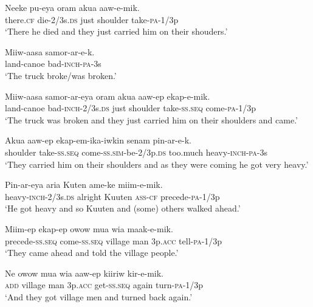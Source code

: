 \ea
\gll  Neeke  pu-eya  oram  akua  aaw-e-mik. \\
there.\textsc{cf}  die-2/3s.\textsc{ds}  just  shoulder  take-\textsc{pa}-1/3p \\
\glt ‘There he died and they just carried him on their shouders.’ \\
\z


\ea
\gll  Miiw-aasa  samor-ar-e-k. \\
land-canoe  bad-\textsc{inch}-\textsc{pa}-3s \\
\glt ‘The truck broke/was broken.’ \\
\z


\ea
\gll  Miiw-aasa  samor-ar-eya  oram  akua  aaw-ep  ekap-e-mik. \\
land-canoe  bad-\textsc{inch}-2/3s.\textsc{ds}  just  shoulder  take-\textsc{ss.seq}  come-\textsc{pa}-1/3p \\
\glt ‘The truck was broken and they just carried him on their shoulders and came.’ \\
\z


\ea
\gll  Akua  aaw-ep  ekap-em-ika-iwkin  senam             pin-ar-e-k. \\
shoulder  take-\textsc{ss.seq}  come-\textsc{ss}.\textsc{sim}-be-2/3p.\textsc{ds}  too.much  heavy-\textsc{inch}-\textsc{pa}-3s \\


\glt ‘They carried him on their shoulders and as they were coming he got very heavy.’ \\
\z


\ea
\gll  Pin-ar-eya  aria  Kuten  ame-ke  miim-e-mik. \\
heavy-\textsc{inch}-2/3s.\textsc{ds}  alright  Kuuten  \textsc{ass}-\textsc{cf}  precede-\textsc{pa}-1/3p \\
\glt ‘He got heavy and so Kuuten and (some) others walked ahead.’ \\
\z


\ea
\gll  Miim-ep  ekap-ep  owow  mua  wia  maak-e-mik. \\
precede-\textsc{ss.seq}  come-\textsc{ss.seq}  village  man  3p.\textsc{acc}  tell-\textsc{pa}-1/3p \\
\glt ‘They came ahead and told the village people.’ \\
\z


\ea
\gll  Ne  owow  mua  wia  aaw-ep  kiiriw  kir-e-mik. \\
\textsc{add}  village  man  3p.\textsc{acc}  get-\textsc{ss.seq}  again  turn-\textsc{pa}-1/3p \\
\glt ‘And they got village men and turned back again.’ \\
\z


